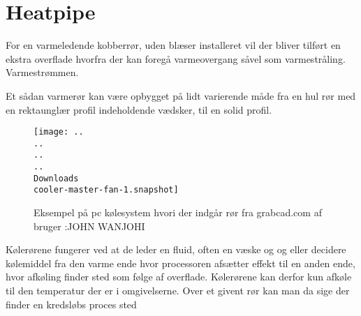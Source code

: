 \section{Heatpipe}

For en varmeledende kobberrør, uden blæser installeret vil der bliver tilført en ekstra overflade hvorfra der kan foregå varmeovergang såvel som varmestråling.
Varmestrømmen.

Et sådan varmerør kan være opbygget på lidt varierende måde fra en hul rør med en rektaunglær profil indeholdende vædsker, til en solid profil. 



\begin{figure}
	\centering
	\texttt{[image: ..\\..\\..\\..\\Downloads\\cooler-master-fan-1.snapshot]}
	\caption{Eksempel på pc kølesystem hvori der indgår rør fra grabcad.com af bruger :JOHN WANJOHI}
	\label{fig:cooler-master-fan-1}
\end{figure}

Kølerørene fungerer ved at de leder en fluid, often en væske og og eller decidere kølemiddel fra den varme ende hvor processoren afsætter effekt til en anden ende, hvor afkøling finder sted som følge af overflade. 
Kølerørene kan derfor kun afkøle til den temperatur der er i omgivelserne. Over et givent rør kan man da sige der finder en kredsløbs proces sted